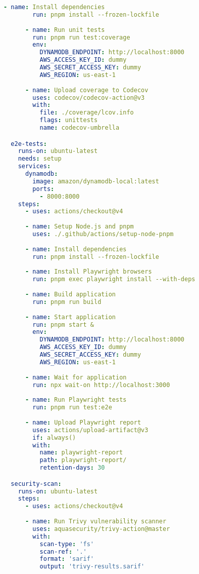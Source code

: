 \begin{lstlisting}[language=YAML, caption=.github/workflows/test-pipeline.yml]
      - name: Install dependencies
        run: pnpm install --frozen-lockfile
        
      - name: Run unit tests
        run: pnpm run test:coverage
        env:
          DYNAMODB_ENDPOINT: http://localhost:8000
          AWS_ACCESS_KEY_ID: dummy
          AWS_SECRET_ACCESS_KEY: dummy
          AWS_REGION: us-east-1
          
      - name: Upload coverage to Codecov
        uses: codecov/codecov-action@v3
        with:
          file: ./coverage/lcov.info
          flags: unittests
          name: codecov-umbrella

  e2e-tests:
    runs-on: ubuntu-latest
    needs: setup
    services:
      dynamodb:
        image: amazon/dynamodb-local:latest
        ports:
          - 8000:8000
    steps:
      - uses: actions/checkout@v4
      
      - name: Setup Node.js and pnpm
        uses: ./.github/actions/setup-node-pnpm
        
      - name: Install dependencies
        run: pnpm install --frozen-lockfile
        
      - name: Install Playwright browsers
        run: pnpm exec playwright install --with-deps
        
      - name: Build application
        run: pnpm run build
        
      - name: Start application
        run: pnpm start &
        env:
          DYNAMODB_ENDPOINT: http://localhost:8000
          AWS_ACCESS_KEY_ID: dummy
          AWS_SECRET_ACCESS_KEY: dummy
          AWS_REGION: us-east-1
          
      - name: Wait for application
        run: npx wait-on http://localhost:3000
        
      - name: Run Playwright tests
        run: pnpm run test:e2e
        
      - name: Upload Playwright report
        uses: actions/upload-artifact@v3
        if: always()
        with:
          name: playwright-report
          path: playwright-report/
          retention-days: 30

  security-scan:
    runs-on: ubuntu-latest
    steps:
      - uses: actions/checkout@v4
      
      - name: Run Trivy vulnerability scanner
        uses: aquasecurity/trivy-action@master
        with:
          scan-type: 'fs'
          scan-ref: '.'
          format: 'sarif'
          output: 'trivy-results.sarif'
          

\end{lstlisting}
